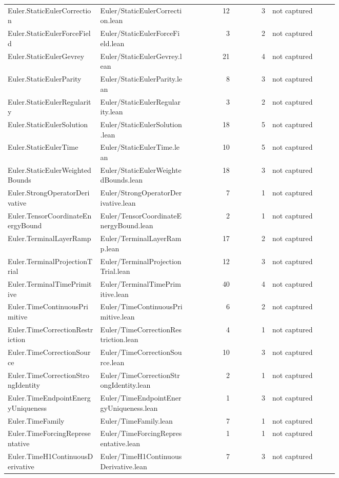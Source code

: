 \documentclass[10pt]{article}
\begin{document}
\begin{longtable}{p{0.28\linewidth}p{0.27\linewidth}r r p{0.20\linewidth}}
Euler.StaticEulerCorrection & Euler/StaticEulerCorrection.lean & 12 & 3 & not captured\\
Euler.StaticEulerForceField & Euler/StaticEulerForceField.lean & 3 & 2 & not captured\\
Euler.StaticEulerGevrey & Euler/StaticEulerGevrey.lean & 21 & 4 & not captured\\
Euler.StaticEulerParity & Euler/StaticEulerParity.lean & 8 & 3 & not captured\\
Euler.StaticEulerRegularity & Euler/StaticEulerRegularity.lean & 3 & 2 & not captured\\
Euler.StaticEulerSolution & Euler/StaticEulerSolution.lean & 18 & 5 & not captured\\
Euler.StaticEulerTime & Euler/StaticEulerTime.lean & 10 & 5 & not captured\\
Euler.StaticEulerWeightedBounds & Euler/StaticEulerWeightedBounds.lean & 18 & 3 & not captured\\
Euler.StrongOperatorDerivative & Euler/StrongOperatorDerivative.lean & 7 & 1 & not captured\\
Euler.TensorCoordinateEnergyBound & Euler/TensorCoordinateEnergyBound.lean & 2 & 1 & not captured\\
Euler.TerminalLayerRamp & Euler/TerminalLayerRamp.lean & 17 & 2 & not captured\\
Euler.TerminalProjectionTrial & Euler/TerminalProjectionTrial.lean & 12 & 3 & not captured\\
Euler.TerminalTimePrimitive & Euler/TerminalTimePrimitive.lean & 40 & 4 & not captured\\
Euler.TimeContinuousPrimitive & Euler/TimeContinuousPrimitive.lean & 6 & 2 & not captured\\
Euler.TimeCorrectionRestriction & Euler/TimeCorrectionRestriction.lean & 4 & 1 & not captured\\
Euler.TimeCorrectionSource & Euler/TimeCorrectionSource.lean & 10 & 3 & not captured\\
Euler.TimeCorrectionStrongIdentity & Euler/TimeCorrectionStrongIdentity.lean & 2 & 1 & not captured\\
Euler.TimeEndpointEnergyUniqueness & Euler/TimeEndpointEnergyUniqueness.lean & 1 & 3 & not captured\\
Euler.TimeFamily & Euler/TimeFamily.lean & 7 & 1 & not captured\\
Euler.TimeForcingRepresentative & Euler/TimeForcingRepresentative.lean & 1 & 1 & not captured\\
Euler.TimeH1ContinuousDerivative & Euler/TimeH1ContinuousDerivative.lean & 7 & 3 & not captured\\

\end{longtable}
\end{document}

